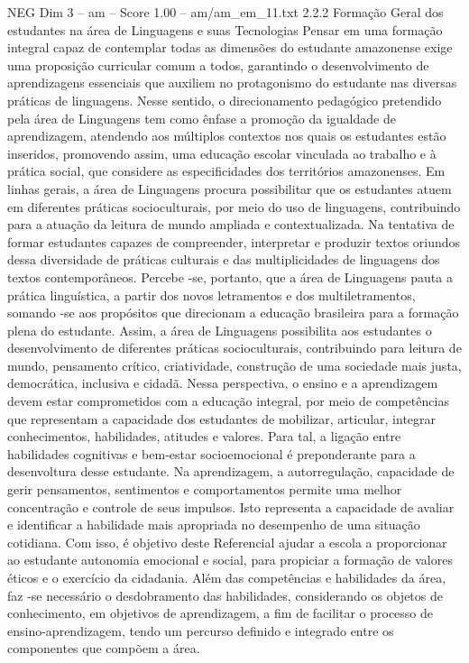 \begin{textsample}{NEG Dim 3 – am – Score 1.00 – am/am\_em\_11.txt}  \label{ex:f3_neg_251}
2.2.2 Formação Geral dos estudantes na área de Linguagens e suas Tecnologias Pensar em uma formação integral capaz de contemplar todas as dimensões do estudante amazonense exige uma proposição curricular comum a todos, garantindo o desenvolvimento de aprendizagens essenciais que auxiliem no protagonismo do estudante nas diversas práticas de linguagens.
Nesse sentido, o direcionamento pedagógico pretendido pela área de Linguagens tem como ênfase a promoção da igualdade de aprendizagem, atendendo aos múltiplos contextos nos quais os estudantes estão inseridos, promovendo assim, uma educação escolar vinculada ao trabalho e à prática social, que considere as especificidades dos territórios amazonenses.
Em linhas gerais, a área de Linguagens procura possibilitar que os estudantes atuem em diferentes práticas socioculturais, por meio do uso de linguagens, contribuindo para a atuação da leitura de mundo ampliada e contextualizada.
Na tentativa de formar estudantes capazes de compreender, interpretar e produzir textos oriundos dessa diversidade de práticas culturais e das multiplicidades de linguagens dos textos contemporâneos.
Percebe -se, portanto, que a área de Linguagens pauta a prática linguística, a partir dos novos letramentos e dos multiletramentos, somando -se aos propósitos que direcionam a educação brasileira para a formação plena do estudante.
Assim, a área de Linguagens possibilita aos estudantes o desenvolvimento de diferentes práticas socioculturais, contribuindo para leitura de mundo, pensamento crítico, criatividade, construção de uma sociedade mais justa, democrática, inclusiva e cidadã.
Nessa perspectiva, o ensino e a aprendizagem devem estar comprometidos com a educação integral, por meio de competências que representam a capacidade dos estudantes de mobilizar, articular, integrar conhecimentos, habilidades, atitudes e valores.
Para tal, a ligação entre habilidades cognitivas e bem-estar socioemocional é preponderante para a desenvoltura desse estudante.
Na aprendizagem, a autorregulação, capacidade de gerir pensamentos, sentimentos e comportamentos permite uma melhor concentração e controle de seus impulsos.
Isto representa a capacidade de avaliar e identificar a habilidade mais apropriada no desempenho de uma situação cotidiana.
Com isso, é objetivo deste Referencial ajudar a escola a proporcionar ao estudante autonomia emocional e social, para propiciar a formação de valores éticos e o exercício da cidadania.
Além das competências e habilidades da área, faz -se necessário o desdobramento das habilidades, considerando os objetos de conhecimento, em objetivos de aprendizagem, a fim de facilitar o processo de ensino-aprendizagem, tendo um percurso definido e integrado entre os componentes que compõem a área.

\end{textsample}

